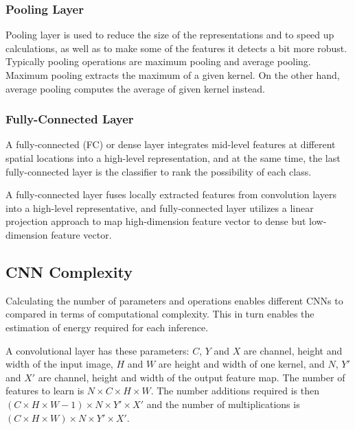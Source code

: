 \subsubsection*{Pooling Layer}

Pooling layer is used to reduce the size of the representations and to speed up calculations, as well as to make some of the features it detects a bit more robust.
Typically pooling operations are maximum pooling and average pooling.
Maximum pooling extracts the maximum of a given kernel. 
On the other hand, average pooling computes the average of given kernel instead.

\subsubsection*{Fully-Connected Layer}

A fully-connected (FC) or dense layer integrates mid-level features at different spatial locations into a high-level representation, and at the same time, the last fully-connected layer is the classifier to rank the possibility of each class.

A fully-connected layer fuses locally extracted features from convolution layers into a high-level representative, and fully-connected layer utilizes a linear projection approach to map high-dimension feature vector to dense but low-dimension feature vector.

\subsection{CNN Complexity}

Calculating the number of parameters and operations enables different CNNs to compared in terms of computational complexity. This in turn enables the estimation of energy required for each inference.

A convolutional layer has these parameters: $C$, $Y$ and $X$  are channel, height and width of the input image, $H$ and $W$ are height and width of one kernel, and $N$, $Y'$ and $X'$ are channel, height and width of the output feature map.
The number of features to learn is $N\times C \times H \times W$.
The number additions required is then $(C\times H\times W-1)\times N\times Y'\times X'$ and the number of multiplications is $(C\times H\times W)\times N\times Y'\times X'$.


